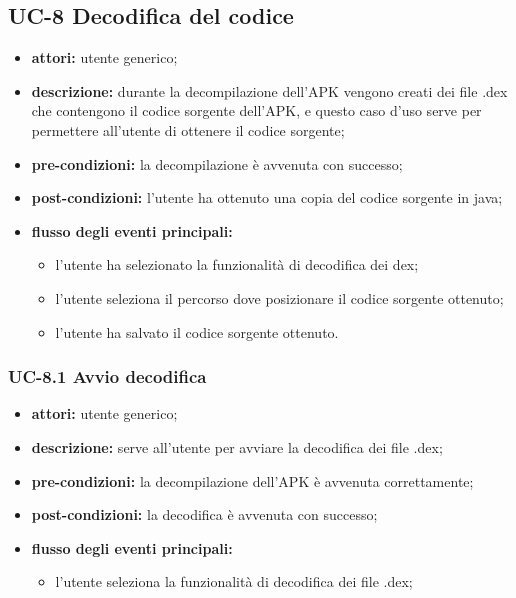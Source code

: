 \subsection*{UC-8 Decodifica del codice}\label{subsec:uc-8-decodifica-del-codice}
\begin{itemize}
    \item \textbf{attori:} utente generico;
    \item \textbf{descrizione:} durante la decompilazione dell'APK vengono creati dei file .dex che contengono il codice sorgente dell'APK, e questo caso d'uso serve per permettere all'utente di ottenere il codice sorgente;
    \item \textbf{pre-condizioni:} la decompilazione è avvenuta con successo;
    \item \textbf{post-condizioni:} l'utente ha ottenuto una copia del codice sorgente in java;
    \item \textbf{flusso degli eventi principali:}
    \begin{itemize}
        \item l'utente ha selezionato la funzionalità di decodifica dei dex;
        \item l'utente seleziona il percorso dove posizionare il codice sorgente ottenuto;
        \item l'utente ha salvato il codice sorgente ottenuto.
    \end{itemize}
\end{itemize}
\subsubsection*{UC-8.1 Avvio decodifica}
\begin{itemize}
    \item \textbf{attori:} utente generico;
    \item \textbf{descrizione:} serve all'utente per avviare la decodifica dei file .dex;
    \item \textbf{pre-condizioni:} la decompilazione dell'APK è avvenuta correttamente;
    \item \textbf{post-condizioni:} la decodifica è avvenuta con successo;
    \item \textbf{flusso degli eventi principali:}
    \begin{itemize}
        \item l'utente seleziona la funzionalità di decodifica dei file .dex;
    \end{itemize}
\end{itemize}
